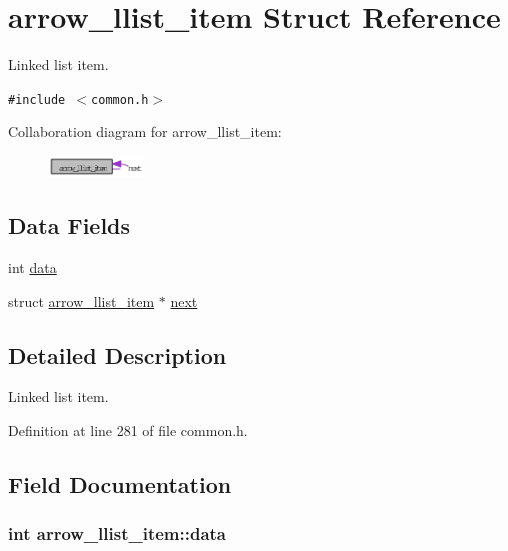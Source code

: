 \hypertarget{structarrow__llist__item}{
\section{arrow\_\-llist\_\-item Struct Reference}
\label{structarrow__llist__item}
}
Linked list item.  


{\tt \#include $<$common.h$>$}

Collaboration diagram for arrow\_\-llist\_\-item:\nopagebreak
\begin{figure}[H]
\begin{center}
\leavevmode
\includegraphics[width=72pt]{structarrow__llist__item__coll__graph}
\end{center}
\end{figure}
\subsection*{Data Fields}
\begin{CompactItemize}
\item 
int \hyperlink{structarrow__llist__item_a90478f82ffebd976893d9b84b6ce189}{data}
\item 
struct \hyperlink{structarrow__llist__item}{arrow\_\-llist\_\-item} $\ast$ \hyperlink{structarrow__llist__item_81a998b260ab022b05f1ff572327b871}{next}
\end{CompactItemize}


\subsection{Detailed Description}
Linked list item. 

Definition at line 281 of file common.h.

\subsection{Field Documentation}
\hypertarget{structarrow__llist__item_a90478f82ffebd976893d9b84b6ce189}{
\subsubsection{\setlength{\rightskip}{0pt plus 5cm}int {\bf arrow\_\-llist\_\-item::data}}}
\label{structarrow__llist__item_a90478f82ffebd976893d9b84b6ce189}


